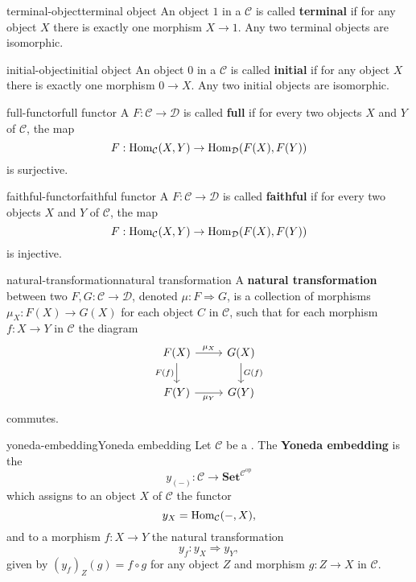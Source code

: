 \begin{topic}{terminal-object}{terminal object}
    An object $1$ in a  $\mathcal{C}$ is called \textbf{terminal} if for any object $X$ there is exactly one morphism $X \to 1$. Any two terminal objects are isomorphic.
\end{topic}

\begin{topic}{initial-object}{initial object}
    An object $0$ in a  $\mathcal{C}$ is called \textbf{initial} if for any object $X$ there is exactly one morphism $0 \to X$. Any two initial objects are isomorphic.
\end{topic}

\begin{topic}{full-functor}{full functor}
    A  $F : \mathcal{C} \to \mathcal{D}$ is called \textbf{full} if for every two objects $X$ and $Y$ of $\mathcal{C}$, the map
    \[ F : \text{Hom}_{\mathcal{C}}(X, Y) \to \text{Hom}_{\mathcal{D}}(F(X), F(Y)) \]
    is surjective.
\end{topic}

\begin{topic}{faithful-functor}{faithful functor}
    A  $F : \mathcal{C} \to \mathcal{D}$ is called \textbf{faithful} if for every two objects $X$ and $Y$ of $\mathcal{C}$, the map
    \[ F : \text{Hom}_{\mathcal{C}}(X, Y) \to \text{Hom}_{\mathcal{D}}(F(X), F(Y)) \]
    is injective.
\end{topic}

\begin{topic}{natural-transformation}{natural transformation}
    A \textbf{natural transformation} between two  $F, G : \mathcal{C} \to \mathcal{D}$, denoted $\mu : F \Rightarrow G$, is a collection of morphisms $\mu_X : F(X) \to G(X)$ for each object $C$ in $\mathcal{C}$, such that for each morphism $f : X \to Y$ in $\mathcal{C}$ the diagram
    \[ \begin{tikzcd} F(X) \arrow{r}{\mu_X} \arrow[swap]{d}{F(f)} & G(X) \arrow{d}{G(f)} \\ F(Y) \arrow[swap]{r}{\mu_Y} & G(Y) \end{tikzcd} \]
    commutes. 
\end{topic}

\begin{topic}{yoneda-embedding}{Yoneda embedding}
    Let $\mathcal{C}$ be a . The \textbf{Yoneda embedding} is the 
    \[ y_{(-)} : \mathcal{C} \to \textbf{Set}^{\mathcal{C}^\text{op}} \]
    which assigns to an object $X$ of $\mathcal{C}$ the functor
    \[ y_X = \text{Hom}_{\mathcal{C}}(-, X) , \]
    and to a morphism $f : X \to Y$ the natural transformation
    \[ y_f : y_X \Rightarrow y_Y , \]
    given by $(y_f)_Z(g) = f \circ g$ for any object $Z$ and morphism $g : Z \to X$ in $\mathcal{C}$.
\end{topic}


